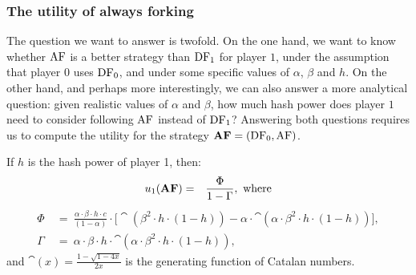 \subsubsection{The utility of always forking}
The question we want to answer is twofold. On the one hand, we want to know whether $\text{\rm AF}$ is a better strategy than $\text{\rm DF}_1$ for player $1$, under the assumption that player $0$ uses $\text{\rm DF}_0$, and under some specific values of $\alpha$, $\beta$ and $h$. 
On the other hand, and 
perhaps more interestingly, we can also answer a more analytical question: given realistic values of $\alpha$ and $\beta$, how much hash power does player $1$ need to consider following $\text{\rm AF}$ instead of $\text{\rm DF}_1$? 
Answering both questions requires us to compute the utility for the strategy $\text{\rm {\bf AF}}=(\text{\rm DF}_0,\text{\rm AF})$. 

\begin{theorem}\label{thm:always_fork}
If $h$ is the hash power of player 1, then:
\begin{eqnarray*}
u_1(\text{\rm {\bf AF}}) &=& \frac{\Phi}{1-\Gamma}, \mbox{ where}
\end{eqnarray*}
\begin{align*}
\Phi & \ = \ \frac{\alpha \cdot \beta \cdot h \cdot c}{(1-\alpha)} \cdot \big[\cat(\beta^2 \cdot h \cdot (1-h)) - \alpha\cdot \cat(\alpha \cdot \beta^2 \cdot h \cdot (1-h))\big],\\
\Gamma & \ = \ \alpha \cdot \beta \cdot h \cdot \cat(\alpha\cdot \beta^2 \cdot h \cdot (1-h)),
\end{align*}
and $\cat(x) = \frac{1-\sqrt{1-4x}}{2x}$ is the generating function of Catalan numbers.
\end{theorem}



